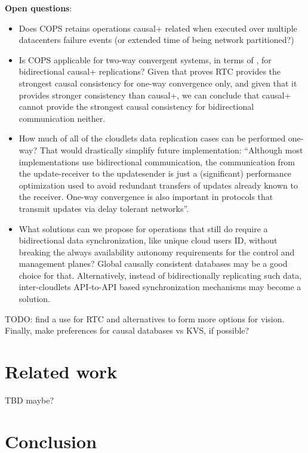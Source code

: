 \documentclass[conference]{IEEEtran}
\begin{document}
\textbf{Open questions}:
\begin{itemize}
  \item Does COPS retains operations causal+ related when executed over
    multiple datacenters failure events (or extended time of being network
    partitioned?)
  \item Is COPS applicable for two-way convergent systems, in terms of
    \cite{b2}, for bidirectional causal+ replications? Given that \cite{b1}
    proves RTC provides the strongest causal consistency for one-way
    convergence only, and given that it provides stronger consistency than
    causal+, we can conclude that causal+ cannot provide the strongest causal
    consistency for bidirectional communication neither.
  \item How much of all of the cloudlets data replication cases can be
    performed one-way? That would drastically simplify future implementation:
    ``Although most implementations use bidirectional communication, the
    communication from the update-receiver to the updatesender is just a
    (significant) performance optimization used to avoid redundant transfers of
    updates already known to the receiver. One-way convergence is also
    important in protocols that transmit updates via delay tolerant
    networks''\cite{b2}.
  \item What solutions can we propose for operations that still do require a
    bidirectional data synchronization, like unique cloud users ID, without
    breaking the always availability autonomy requirements for the control
    and management planes? Global causally consistent databases may be
    a good choice for that. Alternatively, instead of bidirectionally
    replicating such data, inter-cloudlets API-to-API based synchronization
    mechanisms may become a solution.
\end{itemize}

TODO: find a use for RTC and \cite{b6} alternatives to form more
options for vision. Finally, make preferences for causal databases vs KVS, if
possible?

\section{Related work}

TBD maybe?

\section{Conclusion}
\end{document}
